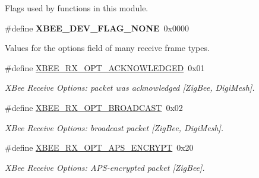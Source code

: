 \label{_amgrp01747264fe7bf50731df0522c351974e}%
Flags used by functions in this module. \begin{DoxyCompactItemize}
\item 
\mbox{\label{group__xbee__device_ga77bd15823a544f1241a6733e74044785}} 
\#define {\bfseries X\+B\+E\+E\+\_\+\+D\+E\+V\+\_\+\+F\+L\+A\+G\+\_\+\+N\+O\+NE}~0x0000
\end{DoxyCompactItemize}
\label{_amgrp01747264fe7bf50731df0522c351974e}%
Values for the {\ttfamily options} field of many receive frame types. \begin{DoxyCompactItemize}
\item 
\mbox{\label{group__xbee__device_gad401ef2f8d1d95e09d607bf3ee0fdb06}} 
\#define \hyperlink{group__xbee__device_gad401ef2f8d1d95e09d607bf3ee0fdb06}{X\+B\+E\+E\+\_\+\+R\+X\+\_\+\+O\+P\+T\+\_\+\+A\+C\+K\+N\+O\+W\+L\+E\+D\+G\+ED}~0x01
\begin{DoxyCompactList}\small\item\em X\+Bee Receive Options\+: packet was acknowledged \mbox{[}Zig\+Bee, Digi\+Mesh\mbox{]}. \end{DoxyCompactList}\item 
\mbox{\label{group__xbee__device_ga6f9c28f688c7f59b8df18f660fb94961}} 
\#define \hyperlink{group__xbee__device_ga6f9c28f688c7f59b8df18f660fb94961}{X\+B\+E\+E\+\_\+\+R\+X\+\_\+\+O\+P\+T\+\_\+\+B\+R\+O\+A\+D\+C\+A\+ST}~0x02
\begin{DoxyCompactList}\small\item\em X\+Bee Receive Options\+: broadcast packet \mbox{[}Zig\+Bee, Digi\+Mesh\mbox{]}. \end{DoxyCompactList}\item 
\mbox{\label{group__xbee__device_gafcd6165b6fd733dea9704d79c5ecc671}} 
\#define \hyperlink{group__xbee__device_gafcd6165b6fd733dea9704d79c5ecc671}{X\+B\+E\+E\+\_\+\+R\+X\+\_\+\+O\+P\+T\+\_\+\+A\+P\+S\+\_\+\+E\+N\+C\+R\+Y\+PT}~0x20
\begin{DoxyCompactList}\small\item\em X\+Bee Receive Options\+: A\+P\+S-\/encrypted packet \mbox{[}Zig\+Bee\mbox{]}. \end{DoxyCompactList}\item 
\mbox{\label{group__xbee__device_gaed8a550b168aa09686266454a2da2a2d}} 

\end{DoxyCompactItemize}
